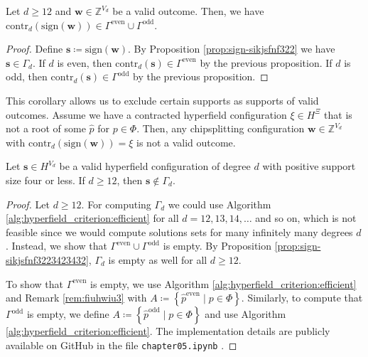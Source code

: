 \begin{corollary}\label{cor:validwunfwufneuiw}
    Let \( d \geq 12 \) and \( \mathbf{w} \in \mathbb{Z}^{V_d} \) be a valid outcome. Then, we have \( \mathrm{contr}_d(\mathrm{sign}(\mathbf{w})) \in \Gamma^{\mathrm{even}} \cup \Gamma^{\mathrm{odd}} \).
\end{corollary}

\begin{proof}
    Define \( \mathbf{s} \coloneqq \mathrm{sign}(\mathbf{w}) \). By Proposition \ref{prop:sign-sikjsfnf322} we have \( \mathbf{s} \in \Gamma_d \). If \( d \) is even, then \( \mathrm{contr}_d(\mathbf{s}) \in \Gamma^{\mathrm{even}} \) by the previous proposition. If \( d \) is odd, then \( \mathrm{contr}_d(\mathbf{s}) \in \Gamma^{\mathrm{odd}} \) by the previous proposition.
\end{proof}

This corollary allows us to exclude certain supports as supports of valid outcomes. Assume we have a contracted hyperfield configuration \( \xi \in H^{\Xi} \) that is not a root of some \( \hat p \) for \( p \in \Phi \). Then, any chipsplitting configuration \( \mathbf{w} \in \mathbb{Z}^{V_d} \) with \( \mathrm{contr}_d( \mathrm{sign}(\mathbf{w})) = \xi \) is not a valid outcome.

\begin{proposition}\label{prop:jasndkjsnjsnkjs}
    Let \( \mathbf{s} \in H^{V_d} \) be a valid hyperfield configuration of degree \( d \) with positive support size four or less. If \( d\geq 12 \), then \( \mathbf{s} \notin \Gamma_d \).
\end{proposition}

\begin{proof}
    Let \( d \geq 12 \). For computing \( \Gamma_d \) we could use Algorithm \ref{alg:hyperfield_criterion:efficient} for all \( d = 12, 13, 14, \dots \) and so on, which is not feasible since we would compute solutions sets for many infinitely many degrees \( d \). Instead, we show that \( \Gamma^{\mathrm{even}} \cup \Gamma^{\mathrm{odd}} \) is empty. By Proposition \ref{prop:sign-sikjsfnf3223423432}, \( \Gamma_d \) is empty as well for all \( d\geq 12 \).

    To show that \(  \Gamma^{\mathrm{even}} \) is empty, we use Algorithm \ref{alg:hyperfield_criterion:efficient} and Remark \ref{rem:fiuhwiu3} with \(A \coloneqq \left\{ \hat p^{\mathrm{even}} \mid p \in \Phi \right\}\). Similarly, to compute that \( \Gamma^{\mathrm{odd}} \) is empty, we define \(A \coloneqq \left\{ \hat p^{\mathrm{odd}} \mid p \in \Phi \right\}\) and use Algorithm \ref{alg:hyperfield_criterion:efficient}. The implementation details are publicly available on GitHub in the file \texttt{chapter05.ipynb} \cite{ducrepo}.
\end{proof}

